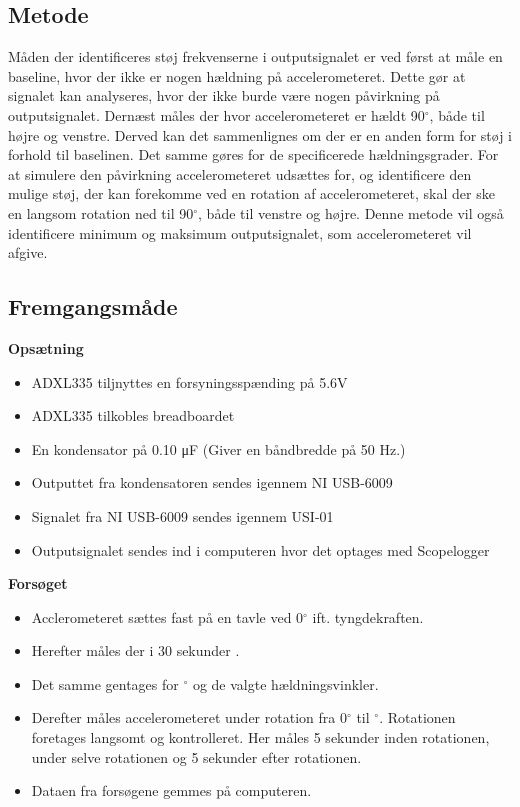 \subsection{Metode}
Måden der identificeres støj frekvenserne i outputsignalet er ved først at måle en baseline, hvor der ikke er nogen hældning på accelerometeret. Dette gør at signalet kan analyseres, hvor der ikke burde være nogen påvirkning på outputsignalet. Dernæst måles der hvor accelerometeret er hældt 90$^{\circ}$, både til højre og venstre. Derved kan det sammenlignes om der er en anden form for støj i forhold til baselinen. Det samme gøres for de specificerede hældningsgrader. For at simulere den påvirkning accelerometeret udsættes for, og identificere den mulige støj, der kan forekomme ved en rotation af accelerometeret, skal der ske en langsom rotation ned til 90$^{\circ}$, både til venstre og højre. Denne metode vil også identificere minimum og maksimum outputsignalet, som accelerometeret vil afgive. 

\subsection{Fremgangsmåde}
\textbf{Opsætning}
\begin{itemize}
\item ADXL335 tiljnyttes en forsyningsspænding på 5.6V
\item ADXL335 tilkobles breadboardet
\item En kondensator på 0.10 μF (Giver en båndbredde på 50 Hz.)
\item Outputtet fra kondensatoren sendes igennem NI USB-6009
\item Signalet fra NI USB-6009 sendes igennem USI-01
\item Outputsignalet sendes ind i computeren hvor det optages med Scopelogger
\end{itemize}

\textbf{Forsøget}
\begin{itemize}
\item Acclerometeret sættes fast på en tavle ved 0$^{\circ}$ ift. tyngdekraften. 
\item Herefter måles der i 30 sekunder .
\item Det samme gentages for $^{\circ}$ og de valgte hældningsvinkler.
\item Derefter måles accelerometeret under rotation fra 0$^{\circ}$ til $^{\circ}$. Rotationen foretages langsomt og kontrolleret. Her måles 5 sekunder inden rotationen, under selve rotationen og 5 sekunder efter rotationen.
\item Dataen fra forsøgene gemmes på computeren.
\end{itemize}









